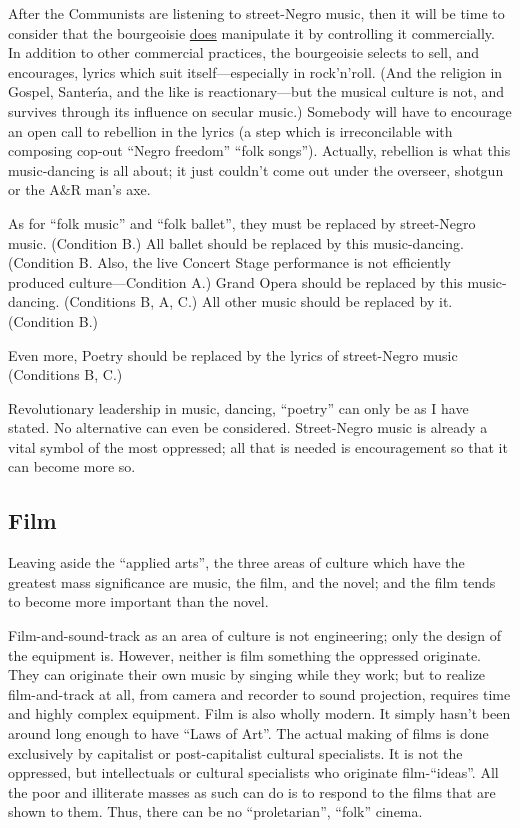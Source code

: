 After the Communists are listening to street-Negro music, then it
will be time to consider that the bourgeoisie \uline{does} manipulate it by
controlling it commercially. In addition to other commercial practices,
the bourgeoisie selects to sell, and encourages, lyrics 
which suit itself---especially in rock'n'roll. (And the religion in
Gospel, Santer\'{\i}a, and the like is reactionary---but the musical
culture is not, and survives through its influence on secular
music.) Somebody will have to encourage an open call to rebellion
in the lyrics (a step which is irreconcilable with composing cop-out
\enquote{Negro freedom} \enquote{folk songs}). Actually, rebellion is what this
music-dancing is all about; it just couldn't come out under the 
overseer, shotgun or the A\&R man's axe. 

As for \enquote{folk music} and \enquote{folk ballet}, they must be replaced by 
street-Negro music. (Condition B.) All ballet should be replaced 
by this music-dancing. (Condition B. Also, the live Concert Stage
performance is not efficiently produced culture---Condition A.)
Grand Opera should be replaced by this music-dancing. (Conditions
B, A, C.) All other music should be replaced by it. (Condition B.) 

Even more, Poetry should be replaced by the lyrics of street-Negro
music (Conditions B, C.) 

Revolutionary leadership in music, dancing, \enquote{poetry} can only be
as I have stated. No alternative can even be considered. Street-Negro
music is already a vital symbol of the most oppressed; all 
that is needed is encouragement so that it can become more so. 

\subsection*{Film}

Leaving aside the \enquote{applied arts}, the three areas of culture which
have the greatest mass significance are music, the film, and the
novel; and the film tends to become more important than the novel. 

Film-and-sound-track as an area of culture is not engineering;
only the design of the equipment is. However, neither is film
something the oppressed originate. They can originate their own
music by singing while they work; but to realize film-and-track
at all, from camera and recorder to sound projection, requires
time and highly complex equipment. Film is also wholly modern.
It simply hasn't been around long enough to have \enquote{Laws of Art}.
The actual making of films is done exclusively by capitalist or
post-capitalist cultural specialists. It is not the oppressed, but 
intellectuals or cultural specialists who originate film-\enquote{ideas}.
All the poor and illiterate masses as such can do is to respond 
to the films that are shown to them. Thus, there can be no \enquote{proletarian}, 
\enquote{folk} cinema. 

